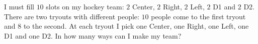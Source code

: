 I must fill $10$ slots on my hockey team: $2$ Center, $2$ Right, $2$ Left, $2$ D1 and $2$ D2. There are two tryouts with different people: $10$ people come to the first tryout and $8$ to the second. At each tryout I pick one Center, one Right, one Left, one D1 and one D2. In how many ways can I make my team?
